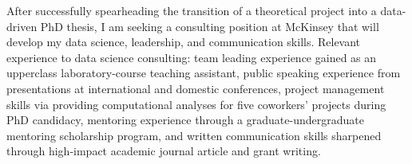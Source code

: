 

\begin{cventries}


\fontsize{10pt}{1em}\bodyfontlight\upshape\color{black}\justify
After successfully spearheading the transition of a theoretical project into a data-driven PhD thesis, I am seeking a consulting position at McKinsey that will develop my data science, leadership, and communication skills. Relevant experience to data science consulting: team leading experience gained as an upperclass laboratory-course teaching assistant, public speaking experience from presentations at international and domestic conferences, project management skills via providing computational analyses for five coworkers' projects during PhD candidacy, mentoring experience through a graduate-undergraduate mentoring scholarship program, and written communication skills sharpened through high-impact academic journal article and grant writing.
    
\vspace{-2.0mm}
\end{cventries}

